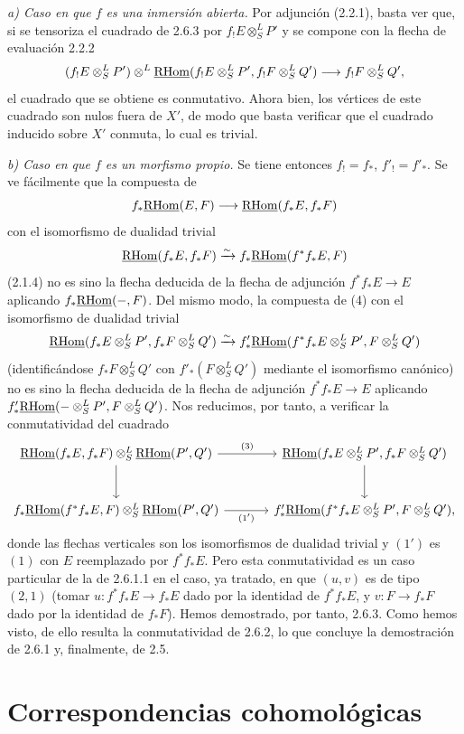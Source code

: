 \emph{a) Caso en que $f$ es una inmersión abierta.} Por adjunción (2.2.1), basta ver que, si se tensoriza el cuadrado de 2.6.3 por $f_!E\otimes^L_SP'$ y se compone con la flecha de evaluación 2.2.2
\[
(f_!E\otimes^L_SP')\otimes^L\underline{\mathrm{RHom}}(f_!E\otimes^L_SP',f_!F\otimes^L_SQ')\longrightarrow f_!F\otimes^L_SQ',
\]
el cuadrado que se obtiene es conmutativo. Ahora bien, los vértices de este cuadrado son nulos fuera de $X'$, de modo que basta verificar que el cuadrado inducido sobre $X'$ conmuta, lo cual es trivial.

\emph{b) Caso en que $f$ es un morfismo propio.} Se tiene entonces $f_!=f_*$, $f'_!=f'_*$. Se ve fácilmente que la compuesta de
\[
f_*\underline{\mathrm{RHom}}(E,F)\longrightarrow\underline{\mathrm{RHom}}(f_*E,f_*F)
\]
con el isomorfismo de dualidad trivial
\[
\underline{\mathrm{RHom}}(f_*E,f_*F)\xrightarrow{\sim}f_*\underline{\mathrm{RHom}}(f^{*}f_*E,F)
\]
(2.1.4) no es sino la flecha deducida de la flecha de adjunción $f^{*}f_*E\to E$ aplicando $f_*\underline{\mathrm{RHom}}(-,F)$. Del mismo modo, la compuesta de (4) con el isomorfismo de dualidad trivial
\[
\underline{\mathrm{RHom}}(f_*E\otimes^L_SP',f_*F\otimes^L_SQ')\xrightarrow{\sim}f'_*\underline{\mathrm{RHom}}(f^{*}f_*E\otimes^L_SP',F\otimes^L_SQ')
\]
(identificándose $f_*F\otimes^L_SQ'$ con $f'_*(F\otimes^L_SQ')$ mediante el isomorfismo canónico) no es sino la flecha deducida de la flecha de adjunción $f^{*}f_*E\to E$ aplicando $f'_*\underline{\mathrm{RHom}}(-\otimes^L_SP',F\otimes^L_SQ')$. Nos reducimos, por tanto, a verificar la conmutatividad del cuadrado
\[
\begin{tikzcd}[column sep=large,row sep=large]
\uRHom(f_*E,f_*F)\otimes^L_S\uRHom(P',Q') \arrow[r,"(3)"] \arrow[d] & \uRHom(f_*E\otimes^L_SP',f_*F\otimes^L_SQ') \arrow[d]\\
f_*\uRHom(f^{*}f_*E,F)\otimes^L_S\uRHom(P',Q') \arrow[r,"(1')"'] & f'_*\uRHom(f^{*}f_*E\otimes^L_SP',F\otimes^L_SQ'),
\end{tikzcd}
\]
donde las flechas verticales son los isomorfismos de dualidad trivial y $(1')$ es $(1)$ con $E$ reemplazado por $f^{*}f_*E$. Pero esta conmutatividad es un caso particular de la de 2.6.1.1 en el caso, ya tratado, en que $(u,v)$ es de tipo $(2,1)$ (tomar $u:f^{*}f_*E\to f_*E$ dado por la identidad de $f^{*}f_*E$, y $v:F\to f_*F$ dado por la identidad de $f_*F$). Hemos demostrado, por tanto, 2.6.3. Como hemos visto, de ello resulta la conmutatividad de 2.6.2, lo que concluye la demostración de 2.6.1 y, finalmente, de 2.5.

\clearpage
\section{Correspondencias cohomológicas}
